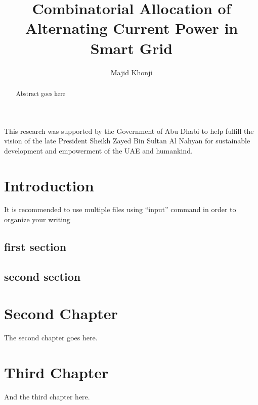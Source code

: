 \documentclass[pdflinks]{masdar-thesis}
\title{Combinatorial Allocation of Alternating Current Power in Smart Grid}
\author{Majid Khonji}
\begin{document}
\maketitle


\begin{abstract}
Abstract goes here
\end{abstract}

\begin{dedication}
	This research was supported by the Government of Abu Dhabi to help fulfill the vision of the late President Sheikh Zayed
	Bin Sultan Al Nahyan for sustainable development and empowerment of the UAE and humankind.
\end{dedication}
\lists %

\chapter{Introduction}
It is recommended to use multiple files using ``input'' command in order to organize your writing
\section{first section}

\section{second section}

\chapter{Second Chapter}
The second chapter goes here.
\chapter{Third Chapter}
And the third chapter here.
\end{document}
